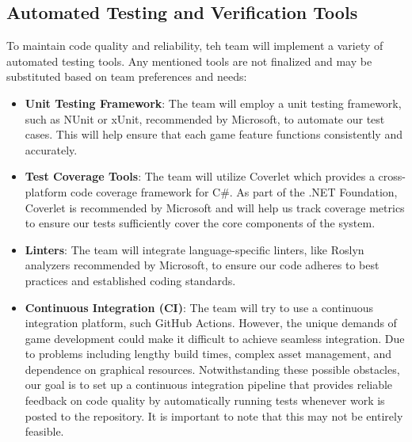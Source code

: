 \documentclass[12pt, titlepage]{article}
\begin{document}
\subsection{Automated Testing and Verification Tools}




\noindent To maintain code quality and reliability, teh team will implement a variety of automated testing tools. Any mentioned tools are not finalized and may be substituted based on team preferences and needs:

  \begin{itemize}
    \item \textbf{Unit Testing Framework}: The team will employ a unit testing framework, such as NUnit or xUnit, recommended by Microsoft, to automate our test cases. This will help ensure that each game feature functions consistently and accurately.
    \item \textbf{Test Coverage Tools}: The team will utilize Coverlet which provides a cross-platform code coverage framework for C\#. As part of the .NET Foundation, Coverlet is recommended by Microsoft and will help us track coverage metrics to ensure our tests sufficiently cover the core components of the system.
    \item \textbf{Linters}: The team will integrate language-specific linters, like Roslyn analyzers recommended by Microsoft, to ensure our code adheres to best practices and established coding standards.
    \item \textbf{Continuous Integration (CI)}: The team will try to use a continuous integration platform, such GitHub Actions. However, the unique demands of game development could make it difficult to achieve seamless integration. Due to problems including lengthy build times, complex asset management, and dependence on graphical resources. Notwithstanding these possible obstacles, our goal is to set up a continuous integration pipeline that provides reliable feedback on code quality by automatically running tests whenever work is posted to the repository. It is important to note that this may not be entirely feasible.
  \end{itemize}
\end{document}
